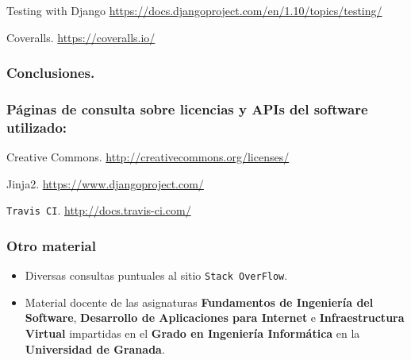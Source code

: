 Testing with Django \url{https://docs.djangoproject.com/en/1.10/topics/testing/}

 Coveralls. \url{https://coveralls.io/}

\subsubsection*{Conclusiones.}

\subsubsection*{Páginas de consulta sobre licencias y APIs del software utilizado:}
 Creative Commons. \url{http://creativecommons.org/licenses/}

 Jinja2. \url{https://www.djangoproject.com/}

 {\tt Travis CI}. \url{http://docs.travis-ci.com/}

\bigskip


\subsubsection*{Otro material}
\begin{itemize}
	\item Diversas consultas puntuales al sitio {\tt Stack OverFlow}.
	\item Material docente de las asignaturas \textbf{Fundamentos de Ingeniería del Software}, \textbf{Desarrollo de Aplicaciones para Internet} e \textbf{Infraestructura Virtual} impartidas en el \textbf{Grado en Ingeniería Informática} en la \textbf{Universidad de Granada}.
\end{itemize}
